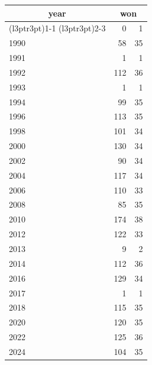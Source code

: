 \footnotesize\begin{tabular}[t]{lrr}
\toprule
\multicolumn{1}{c}{year} & \multicolumn{2}{c}{won} \\
\cmidrule(l{3pt}r{3pt}){1-1} \cmidrule(l{3pt}r{3pt}){2-3}
  & 0 & 1\\
\midrule
1990 & 58 & 35\\
1991 & 1 & 1\\
1992 & 112 & 36\\
1993 & 1 & 1\\
1994 & 99 & 35\\
1996 & 113 & 35\\
1998 & 101 & 34\\
2000 & 130 & 34\\
2002 & 90 & 34\\
2004 & 117 & 34\\
2006 & 110 & 33\\
2008 & 85 & 35\\
2010 & 174 & 38\\
2012 & 122 & 33\\
2013 & 9 & 2\\
2014 & 112 & 36\\
2016 & 129 & 34\\
2017 & 1 & 1\\
2018 & 115 & 35\\
2020 & 120 & 35\\
2022 & 125 & 36\\
2024 & 104 & 35\\
\bottomrule
\end{tabular}
